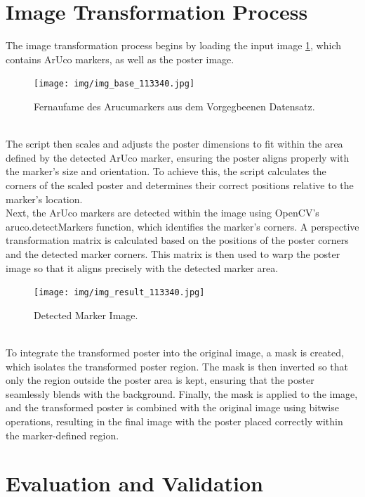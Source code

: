\documentclass[a4paper,twocolumn]{article}
\begin{document}
\section{Image Transformation Process}
The image transformation process begins by loading the input image \ref{fig:example-base}, which contains ArUco markers, as well as the poster image. 
\begin{figure}[h!]
    \centering
    \texttt{[image: img/img\_base\_113340.jpg]} %
    \caption{Fernaufame des Arucumarkers aus dem Vorgegbeenen Datensatz.}
    \label{fig:example-base}
\end{figure}
\\
The script then scales and adjusts the poster dimensions to fit within the area defined by the detected ArUco marker, ensuring the poster aligns properly with the marker's size and orientation. To achieve this, the script calculates the corners of the scaled poster and determines their correct positions relative to the marker's location. 
\\
Next, the ArUco markers are detected within the image using OpenCV's aruco.detectMarkers function, which identifies the marker's corners. A perspective transformation matrix is calculated based on the positions of the poster corners and the detected marker corners. This matrix is then used to warp the poster image so that it aligns precisely with the detected marker area.
\begin{figure}[h!]
    \centering
    \texttt{[image: img/img\_result\_113340.jpg]} %
    \caption{Detected Marker Image.}
    \label{fig:example-result}
\end{figure}
\\
To integrate the transformed poster into the original image, a mask is created, which isolates the transformed poster region. The mask is then inverted so that only the region outside the poster area is kept, ensuring that the poster seamlessly blends with the background. Finally, the mask is applied to the image, and the transformed poster is combined with the original image using bitwise operations, resulting in the final image with the poster placed correctly within the marker-defined region.

\section{Evaluation and Validation}
\end{document}
